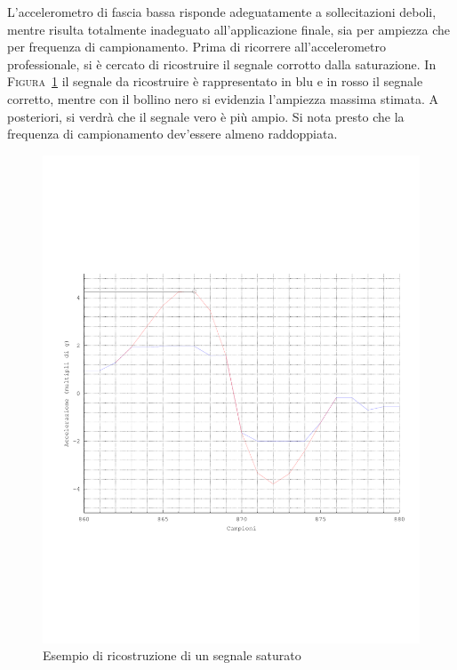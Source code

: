     L'accelerometro di fascia bassa risponde adeguatamente a sollecitazioni deboli,
    mentre risulta totalmente inadeguato all'applicazione finale,
    sia per ampiezza che per frequenza di campionamento.
    Prima di ricorrere all'accelerometro professionale,
    si è cercato di ricostruire il segnale corrotto dalla saturazione.
    In \textsc{Figura~\ref{fig:ricostruzione}}
    il segnale da ricostruire è rappresentato in blu e
    in rosso il segnale corretto, mentre
    con il bollino nero si evidenzia l'ampiezza massima stimata.
    A posteriori, si verdrà che il segnale vero è più ampio.
    Si nota presto che la frequenza di campionamento
    dev'essere almeno raddoppiata.


	\begin{figure}
		\begin{center}
		\includegraphics[width=\columnwidth]{taybella_copia}
		\caption{Esempio di ricostruzione di un segnale saturato}
		\label{fig:ricostruzione}
		\end{center}
	\end{figure}

